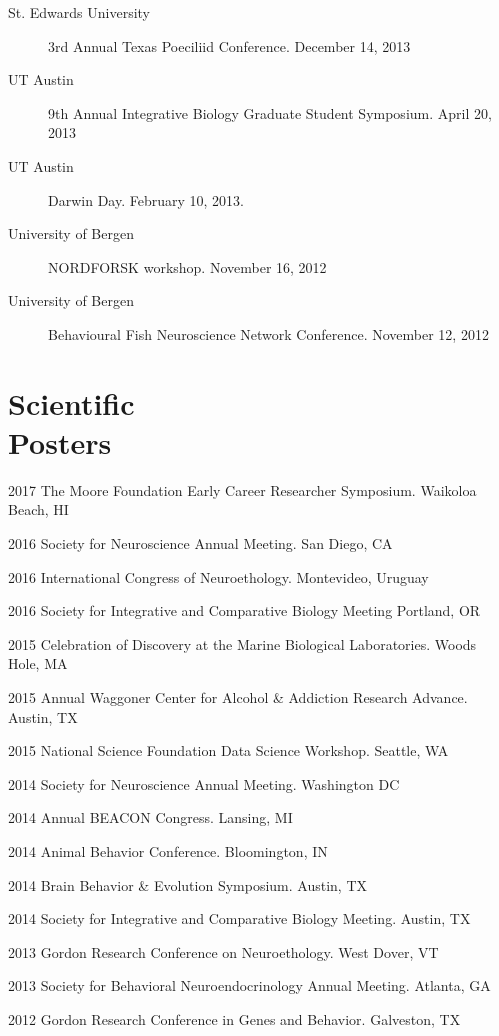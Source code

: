 \documentclass[margin,line]{CV}
\begin{document}
\begin{resume}
\begin{description}
\item[St. Edwards University] 3rd Annual Texas Poeciliid Conference. December 14, 2013 
\item[UT Austin] 9th Annual Integrative Biology Graduate Student Symposium. April 20, 2013
\item[UT Austin] Darwin Day. February 10, 2013.
\item[University of Bergen] NORDFORSK workshop. November 16, 2012
\item[University of Bergen] Behavioural Fish Neuroscience Network Conference. November 12, 2012

\end{description}


\section{\mysidestyle Scientific\\Posters}

\begin{list1}
\item[]2017	The Moore Foundation Early Career Researcher Symposium. Waikoloa Beach, HI
\item[]2016	Society for Neuroscience Annual Meeting. San Diego, CA
\item[]2016	International Congress of Neuroethology. Montevideo, Uruguay
\item[]2016 Society for Integrative and Comparative Biology Meeting Portland, OR
\item[]2015	Celebration of Discovery at the Marine Biological Laboratories. Woods Hole, MA
\item[]2015	Annual Waggoner Center for Alcohol \& Addiction Research Advance. Austin, TX
\item[]2015	National Science Foundation Data Science Workshop. Seattle, WA
\item[]2014	Society for Neuroscience Annual Meeting. Washington DC
\item[]2014	Annual BEACON Congress. Lansing, MI
\item[]2014	Animal Behavior Conference. Bloomington, IN
\item[]2014	Brain Behavior \& Evolution Symposium. Austin, TX
\item[]2014	Society for Integrative and Comparative Biology Meeting. Austin, TX
\item[]2013	Gordon Research Conference on Neuroethology. West Dover, VT
\item[]2013	Society for Behavioral Neuroendocrinology Annual Meeting. Atlanta, GA
\item[]2012	Gordon Research Conference in Genes and Behavior. Galveston, TX
\end{list1}



\end{resume}
\end{document}

